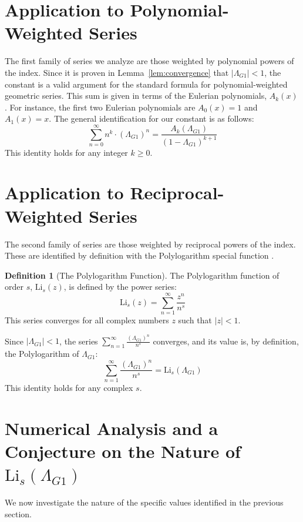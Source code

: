 \documentclass{amsart}
\theoremstyle{plain}
\theoremstyle{definition}
\newtheorem{definition}[theorem]{Definition}
\theoremstyle{remark}
\newcommand{\LambdaG}{\Lambda_{G1}}
\begin{document}
\section{Application to Polynomial-Weighted Series}
The first family of series we analyze are those weighted by polynomial powers of the index. Since it is proven in Lemma~\ref{lem:convergence} that $|\LambdaG|<1$, the constant is a valid argument for the standard formula for polynomial-weighted geometric series. This sum is given in terms of the Eulerian polynomials, $A_k(x)$ \cite{AandS}. For instance, the first two Eulerian polynomials are $A_0(x)=1$ and $A_1(x)=x$. The general identification for our constant is as follows:
$$ \sum_{n=0}^{\infty} n^k \cdot (\LambdaG)^n = \frac{A_k(\LambdaG)}{(1-\LambdaG)^{k+1}} $$
This identity holds for any integer $k \ge 0$.

\section{Application to Reciprocal-Weighted Series}
The second family of series are those weighted by reciprocal powers of the index. These are identified by definition with the Polylogarithm special function \cite{Lewin}.

\begin{definition}[The Polylogarithm Function]
The Polylogarithm function of order $s$, $\mathrm{Li}_s(z)$, is defined by the power series:
$$ \mathrm{Li}_s(z) = \sum_{n=1}^{\infty} \frac{z^n}{n^s} $$
This series converges for all complex numbers $z$ such that $|z|<1$.
\end{definition}

Since $|\LambdaG| < 1$, the series $\sum_{n=1}^{\infty} \frac{(\LambdaG)^{n}}{n^s}$ converges, and its value is, by definition, the Polylogarithm of $\LambdaG$:
$$ \sum_{n=1}^{\infty} \frac{(\LambdaG)^{n}}{n^s} = \mathrm{Li}_s(\LambdaG) $$
This identity holds for any complex $s$.

\section{Numerical Analysis and a Conjecture on the Nature of \texorpdfstring{$\mathrm{Li}_s(\LambdaG)$}{Li\_s(Lambda\_G1)}}
We now investigate the nature of the specific values identified in the previous section.
\end{document}
